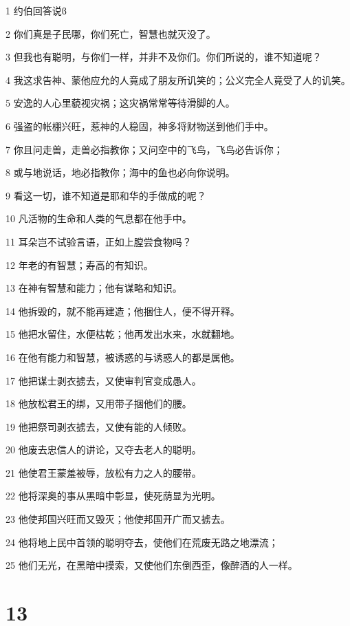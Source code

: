 \par 1 约伯回答说ϐ
\par 2 你们真是子民哪，你们死亡，智慧也就灭没了。
\par 3 但我也有聪明，与你们一样，并非不及你们。你们所说的，谁不知道呢？
\par 4 我这求告神、蒙他应允的人竟成了朋友所讥笑的；公义完全人竟受了人的讥笑。
\par 5 安逸的人心里藐视灾祸；这灾祸常常等待滑脚的人。
\par 6 强盗的帐棚兴旺，惹神的人稳固，神多将财物送到他们手中。
\par 7 你且问走兽，走兽必指教你；又问空中的飞鸟，飞鸟必告诉你；
\par 8 或与地说话，地必指教你；海中的鱼也必向你说明。
\par 9 看这一切，谁不知道是耶和华的手做成的呢？
\par 10 凡活物的生命和人类的气息都在他手中。
\par 11 耳朵岂不试验言语，正如上膛尝食物吗？
\par 12 年老的有智慧；寿高的有知识。
\par 13 在神有智慧和能力；他有谋略和知识。
\par 14 他拆毁的，就不能再建造；他捆住人，便不得开释。
\par 15 他把水留住，水便枯乾；他再发出水来，水就翻地。
\par 16 在他有能力和智慧，被诱惑的与诱惑人的都是属他。
\par 17 他把谋士剥衣掳去，又使审判官变成愚人。
\par 18 他放松君王的绑，又用带子捆他们的腰。
\par 19 他把祭司剥衣掳去，又使有能的人倾败。
\par 20 他废去忠信人的讲论，又夺去老人的聪明。
\par 21 他使君王蒙羞被辱，放松有力之人的腰带。
\par 22 他将深奥的事从黑暗中彰显，使死荫显为光明。
\par 23 他使邦国兴旺而又毁灭；他使邦国开广而又掳去。
\par 24 他将地上民中首领的聪明夺去，使他们在荒废无路之地漂流；
\par 25 他们无光，在黑暗中摸索，又使他们东倒西歪，像醉酒的人一样。

\chapter{13}

